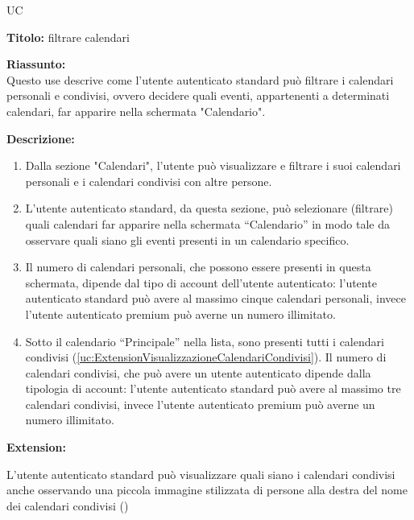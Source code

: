 \begin{listaPersonale}{UC}

    \begin{center}
        
    \end{center}

    \textbf{Titolo:} filtrare calendari

    \textbf{Riassunto:} \\
    Questo use descrive come l'utente autenticato standard può filtrare i calendari personali e condivisi, ovvero decidere  quali eventi, appartenenti a determinati calendari, far apparire nella schermata "Calendario".

    \textbf{Descrizione:}
    \begin{enumerate}
        \item Dalla sezione "Calendari", l'utente può visualizzare e filtrare i suoi calendari personali e i calendari condivisi con altre persone.
        \item L'utente autenticato standard, da questa sezione, può selezionare (filtrare) quali calendari far apparire nella schermata “Calendario” in modo tale da osservare quali siano gli eventi presenti in un calendario specifico.
        \item Il numero di calendari personali, che possono essere presenti in questa schermata, dipende dal tipo di account dell'utente autenticato: l'utente autenticato standard può avere al massimo cinque calendari personali, invece l'utente autenticato premium può averne un numero illimitato.
        \item Sotto il calendario “Principale” nella lista, sono presenti tutti i calendari condivisi (\ref{uc:ExtensionVisualizzazioneCalendariCondivisi}). Il numero di calendari condivisi, che può avere un utente autenticato dipende dalla tipologia di account: l'utente autenticato standard può avere al massimo tre calendari condivisi, invece l'utente autenticato premium può averne un numero illimitato.
    \end{enumerate}


    \textbf{Extension:}
    \begin{enumerate}[label=\textbf{[extension \arabic{enumii}]}, ref= \textbf{[extension \arabic{enumii}]}]
         L'utente autenticato standard può visualizzare quali siano i calendari condivisi anche osservando una piccola immagine stilizzata di persone alla destra del nome dei calendari condivisi ()
    \end{enumerate}



\end{listaPersonale}
